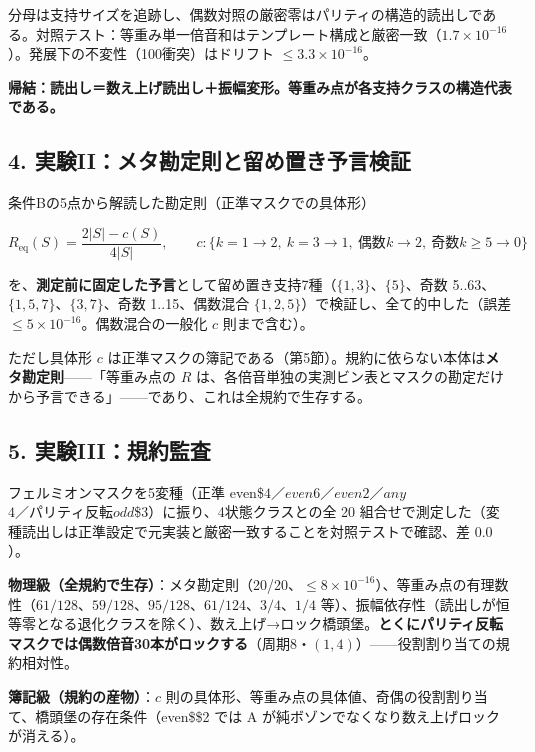\documentclass[
  a4paper,
]{ltjsarticle}
\begin{document}
分母は支持サイズを追跡し、偶数対照の厳密零はパリティの構造的読出しである。対照テスト：等重み単一倍音和はテンプレート構成と厳密一致（\(1.7\times10^{-16}\)）。発展下の不変性（100衝突）はドリフト
\(\le3.3\times10^{-16}\)。

\textbf{帰結：読出し＝数え上げ読出し＋振幅変形。等重み点が各支持クラスの構造代表である。}

\subsection{4.
実験II：メタ勘定則と留め置き予言検証}\label{ux5b9fux9a13iiux30e1ux30bfux52d8ux5b9aux5247ux3068ux7559ux3081ux7f6eux304dux4e88ux8a00ux691cux8a3c}

条件Bの5点から解読した勘定則（正準マスクでの具体形）

\[
R_{\mathrm{eq}}(S)=\frac{2|S|-c(S)}{4|S|},\qquad
c:\{k{=}1\to2,\ k{=}3\to1,\ \text{偶数}k\to2,\ \text{奇数}k{\ge}5\to0\}
\]

を、\textbf{測定前に固定した予言}として留め置き支持7種（\(\{1,3\}\)、\(\{5\}\)、奇数
5..63、\(\{1,5,7\}\)、\(\{3,7\}\)、奇数 1..15、偶数混合
\(\{1,2,5\}\)）で検証し、全て的中した（誤差
\(\le5\times10^{-16}\)。偶数混合の一般化 \(c\) 則まで含む）。

ただし具体形 \(c\)
は正準マスクの簿記である（第5節）。規約に依らない本体は\textbf{メタ勘定則}------「等重み点の
\(R\)
は、各倍音単独の実測ビン表とマスクの勘定だけから予言できる」------であり、これは全規約で生存する。

\subsection{5.
実験III：規約監査}\label{ux5b9fux9a13iiiux898fux7d04ux76e3ux67fb}

フェルミオンマスクを5変種（正準
even\$\ge\(4／even\)\ge\(6／even\)\ge\(2／any\)\ge\(4／パリティ反転 odd\)\ge\$3）に振り、4状態クラスとの全
20
組合せで測定した（変種読出しは正準設定で元実装と厳密一致することを対照テストで確認、差
\(0.0\)）。

\textbf{物理級（全規約で生存）}：メタ勘定則（20/20、\(\le8\times10^{-16}\)）、等重み点の有理数性（\(61/128\)、\(59/128\)、\(95/128\)、\(61/124\)、\(3/4\)、\(1/4\)
等）、振幅依存性（読出しが恒等零となる退化クラスを除く）、数え上げ→ロック橋頭堡。\textbf{とくにパリティ反転マスクでは偶数倍音30本がロックする}（周期8・\((1,4)\)）------役割割り当ての規約相対性。

\textbf{簿記級（規約の産物）}：\(c\)
則の具体形、等重み点の具体値、奇偶の役割割り当て、橋頭堡の存在条件（even\$\ge\$2
では A が純ボゾンでなくなり数え上げロックが消える）。
\end{document}
